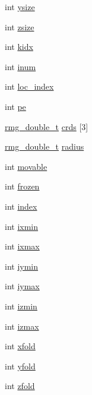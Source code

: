 \begin{DoxyCompactItemize}
\item 
int \hyperlink{struct_s_t_a_t_e_a3b736c1044768a1b1dd80ef81bb6400e}{ysize}
\item 
int \hyperlink{struct_s_t_a_t_e_a31ecde2a6f98a2668566cca79c91217f}{zsize}
\item 
int \hyperlink{struct_s_t_a_t_e_ab2d8423cf507b9585d85f5b10a27326c}{kidx}
\item 
int \hyperlink{struct_s_t_a_t_e_a89d473469ea5969b993f395f0e2cce27}{inum}
\item 
int \hyperlink{struct_s_t_a_t_e_acaca318767587e321bdc410210393e6f}{loc\-\_\-index}
\item 
int \hyperlink{struct_s_t_a_t_e_a1df3468929a5be1abb9598902c5dde0d}{pe}
\item 
\hyperlink{rmgtypes_8h_aaa16921c14f121c56eaa42390a340db8}{rmg\-\_\-double\-\_\-t} \hyperlink{struct_s_t_a_t_e_a104e56d7f0b8320f2df5f52e7212b2bf}{crds} \mbox{[}3\mbox{]}
\item 
\hyperlink{rmgtypes_8h_aaa16921c14f121c56eaa42390a340db8}{rmg\-\_\-double\-\_\-t} \hyperlink{struct_s_t_a_t_e_a6516e948ae5dfa73df2b3f750be5aef0}{radius}
\item 
int \hyperlink{struct_s_t_a_t_e_ab4a1a330cadb70247c06776140f60d29}{movable}
\item 
int \hyperlink{struct_s_t_a_t_e_a47e0376ad31687400d14afe75415ab81}{frozen}
\item 
int \hyperlink{struct_s_t_a_t_e_aff1da56ba611c82f8429afb9668db8aa}{index}
\item 
int \hyperlink{struct_s_t_a_t_e_ac1c74dc820f6dd25a29f5c61cd3fdf4a}{ixmin}
\item 
int \hyperlink{struct_s_t_a_t_e_a75ad4f45d1f4d52a01cdf0674ce19fcd}{ixmax}
\item 
int \hyperlink{struct_s_t_a_t_e_a29dbcb291ba135b394ce13b1851605c6}{iymin}
\item 
int \hyperlink{struct_s_t_a_t_e_a0233f519c3a9df1aa6bce3a920f49aca}{iymax}
\item 
int \hyperlink{struct_s_t_a_t_e_a495ef2ace16d4fc498894d751044967a}{izmin}
\item 
int \hyperlink{struct_s_t_a_t_e_aae7318da056f91cfa69f3e3cf9d4b719}{izmax}
\item 
int \hyperlink{struct_s_t_a_t_e_a5c319fa34878f1a22ff99035837d0a65}{xfold}
\item 
int \hyperlink{struct_s_t_a_t_e_ac0ef2d5ee6fbaf827b30bc248e9dbb72}{yfold}
\item 
int \hyperlink{struct_s_t_a_t_e_a3af064ea668c7293e1b258413b2ad0f8}{zfold}

\end{DoxyCompactItemize}
